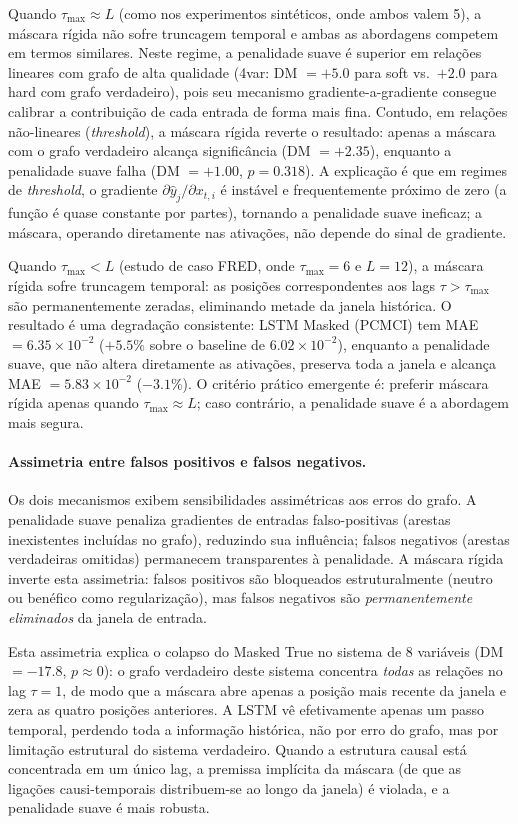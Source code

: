 \documentclass[12pt, a4paper]{article}
\begin{document}
Quando $\tau_{\max} \approx L$ (como nos experimentos sintéticos, onde ambos valem 5), a máscara rígida não sofre truncagem temporal e ambas as abordagens competem em termos similares. Neste regime, a penalidade suave é superior em relações lineares com grafo de alta qualidade (4var: DM $= +5.0$ para soft vs.\ $+2.0$ para hard com grafo verdadeiro), pois seu mecanismo gradiente-a-gradiente consegue calibrar a contribuição de cada entrada de forma mais fina. Contudo, em relações não-lineares (\emph{threshold}), a máscara rígida reverte o resultado: apenas a máscara com o grafo verdadeiro alcança significância (DM $= +2.35$), enquanto a penalidade suave falha (DM $= +1.00$, $p = 0.318$). A explicação é que em regimes de \emph{threshold}, o gradiente $\partial \hat{y}_j / \partial x_{t,i}$ é instável e frequentemente próximo de zero (a função é quase constante por partes), tornando a penalidade suave ineficaz; a máscara, operando diretamente nas ativações, não depende do sinal de gradiente.

Quando $\tau_{\max} < L$ (estudo de caso FRED, onde $\tau_{\max} = 6$ e $L = 12$), a máscara rígida sofre truncagem temporal: as posições correspondentes aos lags $\tau > \tau_{\max}$ são permanentemente zeradas, eliminando metade da janela histórica. O resultado é uma degradação consistente: LSTM Masked (PCMCI) tem MAE $= 6.35 \times 10^{-2}$ ($+5.5\%$ sobre o baseline de $6.02 \times 10^{-2}$), enquanto a penalidade suave, que não altera diretamente as ativações, preserva toda a janela e alcança MAE $= 5.83 \times 10^{-2}$ ($-3.1\%$). O critério prático emergente é: preferir máscara rígida apenas quando $\tau_{\max} \approx L$; caso contrário, a penalidade suave é a abordagem mais segura.

\paragraph{Assimetria entre falsos positivos e falsos negativos.}
Os dois mecanismos exibem sensibilidades assimétricas aos erros do grafo. A penalidade suave penaliza gradientes de entradas falso-positivas (arestas inexistentes incluídas no grafo), reduzindo sua influência; falsos negativos (arestas verdadeiras omitidas) permanecem transparentes à penalidade. A máscara rígida inverte esta assimetria: falsos positivos são bloqueados estruturalmente (neutro ou benéfico como regularização), mas falsos negativos são \emph{permanentemente eliminados} da janela de entrada.

Esta assimetria explica o colapso do Masked True no sistema de 8 variáveis (DM $= -17.8$, $p \approx 0$): o grafo verdadeiro deste sistema concentra \emph{todas} as relações no lag $\tau = 1$, de modo que a máscara abre apenas a posição mais recente da janela e zera as quatro posições anteriores. A LSTM vê efetivamente apenas um passo temporal, perdendo toda a informação histórica, não por erro do grafo, mas por limitação estrutural do sistema verdadeiro. Quando a estrutura causal está concentrada em um único lag, a premissa implícita da máscara (de que as ligações causi-temporais distribuem-se ao longo da janela) é violada, e a penalidade suave é mais robusta.
\end{document}
